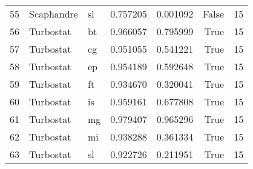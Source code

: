 \begin{tabular}{lllrrrr}
55 & Scaphandre & sl & 0.757205 & 0.001092 & False & 15 \\
56 & Turbostat & bt & 0.966057 & 0.795999 & True & 15 \\
57 & Turbostat & cg & 0.951055 & 0.541221 & True & 15 \\
58 & Turbostat & ep & 0.954189 & 0.592648 & True & 15 \\
59 & Turbostat & ft & 0.934670 & 0.320041 & True & 15 \\
60 & Turbostat & is & 0.959161 & 0.677808 & True & 15 \\
61 & Turbostat & mg & 0.979407 & 0.965296 & True & 15 \\
62 & Turbostat & mi & 0.938288 & 0.361334 & True & 15 \\
63 & Turbostat & sl & 0.922726 & 0.211951 & True & 15 \\
\bottomrule
\end{tabular}
